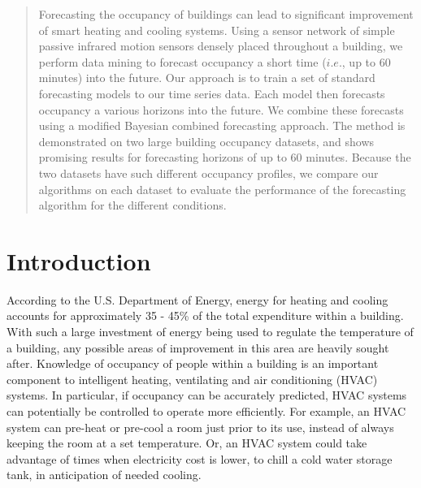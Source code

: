 \documentclass{acm_proc_article-sp}
\begin{document}
\date{6 June 2013}

\maketitle
\begin{abstract}
Forecasting the occupancy of buildings can lead to significant improvement of smart heating and cooling systems. Using a sensor network of simple passive infrared motion sensors densely placed throughout a building, we perform data mining to forecast occupancy a short time ($i.e.$, up to 60 minutes) into the future.  Our approach is to train a set of standard forecasting models to our time series data.  Each model then forecasts occupancy a various horizons into the future.  We combine these forecasts using a modified Bayesian combined forecasting approach.  The method is demonstrated on two large building occupancy datasets, and shows promising results for forecasting horizons of up to 60 minutes.  Because the two datasets have such different occupancy profiles, we compare our algorithms on each dataset to evaluate the performance of the forecasting algorithm for the different conditions.
\end{abstract}




\section{Introduction}

According to the U.S. Department of Energy, energy for heating and cooling accounts for approximately 35 - 45\% \cite{DOE2010} of the total expenditure within a building. With such a large investment of energy being used to regulate the temperature of a building, any possible areas of improvement in this area are heavily sought after.  Knowledge of occupancy of people within a building is an important component to intelligent heating, ventilating and air conditioning (HVAC) systems.  In particular, if occupancy can be accurately predicted, HVAC systems can potentially be controlled to operate more efficiently.  For example, an HVAC system can pre-heat or pre-cool a room just prior to its use, instead of always keeping the room at a set temperature.  Or, an HVAC system could take advantage of times when electricity cost is lower, to chill a cold water storage tank, in anticipation of needed cooling.
\end{document}
